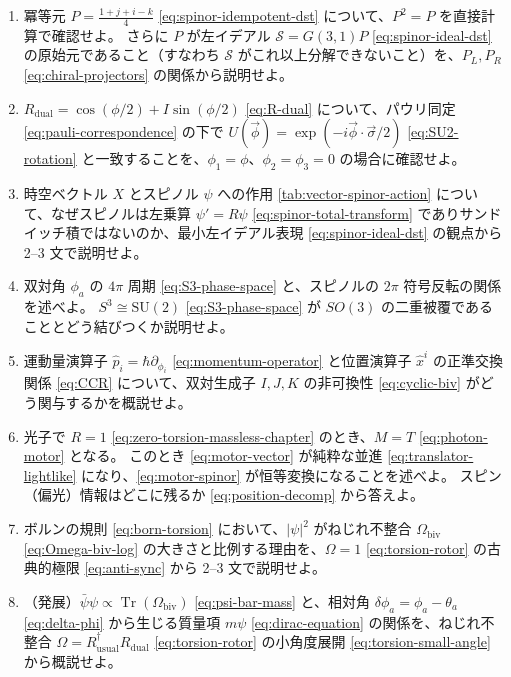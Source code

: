 \documentclass[dvipdfmx,a4paper,oneside]{jsbook}
\numberwithin{equation}{chapter}
\begin{document}
\begin{enumerate}[leftmargin=2em]
  \item 冪等元 \(P = \frac{1+j+i-k}{4}\) \eqref{eq:spinor-idempotent-dst} について、\(P^2 = P\) を直接計算で確認せよ。
  さらに \(P\) が左イデアル \(\mathcal{S} = G(3,1)P\) \eqref{eq:spinor-ideal-dst} の原始元であること（すなわち \(\mathcal{S}\) がこれ以上分解できないこと）を、\(P_L, P_R\) \eqref{eq:chiral-projectors} の関係から説明せよ。

  \item \(R_{\mathrm{dual}} = \cos(\phi/2) + I\sin(\phi/2)\) \eqref{eq:R-dual} について、パウリ同定 \eqref{eq:pauli-correspondence} の下で \(U(\vec\phi) = \exp(-i\vec\phi\cdot\vec\sigma/2)\) \eqref{eq:SU2-rotation} と一致することを、\(\phi_1 = \phi\)、\(\phi_2 = \phi_3 = 0\) の場合に確認せよ。

  \item 時空ベクトル \(X\) とスピノル \(\psi\) への作用 \eqref{tab:vector-spinor-action} について、なぜスピノルは左乗算 \(\psi' = R\psi\) \eqref{eq:spinor-total-transform} でありサンドイッチ積ではないのか、最小左イデアル表現 \eqref{eq:spinor-ideal-dst} の観点から 2--3 文で説明せよ。

  \item 双対角 \(\phi_a\) の \(4\pi\) 周期 \eqref{eq:S3-phase-space} と、スピノルの \(2\pi\) 符号反転の関係を述べよ。
  \(S^3 \cong \mathrm{SU}(2)\) \eqref{eq:S3-phase-space} が \(SO(3)\) の二重被覆であることとどう結びつくか説明せよ。

  \item 運動量演算子 \(\hat{p}_i = \hbar\partial_{\phi_i}\) \eqref{eq:momentum-operator} と位置演算子 \(\hat{x}^i\) の正準交換関係 \eqref{eq:CCR} について、双対生成子 \(I, J, K\) の非可換性 \eqref{eq:cyclic-biv} がどう関与するかを概説せよ。

  \item 光子で \(R = 1\) \eqref{eq:zero-torsion-massless-chapter} のとき、\(M = T\) \eqref{eq:photon-motor} となる。
  このとき \eqref{eq:motor-vector} が純粋な並進 \eqref{eq:translator-lightlike} になり、\eqref{eq:motor-spinor} が恒等変換になることを述べよ。
  スピン（偏光）情報はどこに残るか \eqref{eq:position-decomp} から答えよ。

  \item ボルンの規則 \eqref{eq:born-torsion} において、\(|\psi|^2\) がねじれ不整合 \(\Omega_{\mathrm{biv}}\) \eqref{eq:Omega-biv-log} の大きさと比例する理由を、\(\Omega = 1\) \eqref{eq:torsion-rotor} の古典的極限 \eqref{eq:anti-sync} から 2--3 文で説明せよ。

  \item （発展）\(\bar\psi\psi \propto \operatorname{Tr}(\Omega_{\mathrm{biv}})\) \eqref{eq:psi-bar-mass} と、相対角 \(\delta\phi_a = \phi_a - \theta_a\) \eqref{eq:delta-phi} から生じる質量項 \(m\psi\) \eqref{eq:dirac-equation} の関係を、ねじれ不整合 \(\Omega = R_{\mathrm{usual}}^\dagger R_{\mathrm{dual}}\) \eqref{eq:torsion-rotor} の小角度展開 \eqref{eq:torsion-small-angle} から概説せよ。
\end{enumerate}
\end{document}
